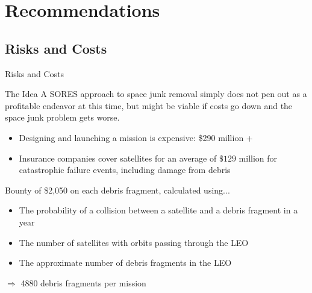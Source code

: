 \documentclass{beamer}
\begin{document}
\section{Recommendations}

\subsection{Risks and Costs}

\begin{frame}{Risks and Costs}
  \begin{block}{The Idea}
 A SORES approach to space junk removal simply does not pen out as a profitable endeavor at this time, but might be viable if costs go down and the space junk problem gets worse.
\end{block}
  \begin{itemize}
  \item {
    Designing and launching a mission is expensive: \$290 million + \cite{cost}
  }
  \item {   
   Insurance companies cover satellites for an average of \(\$129\) million for catastrophic failure events, including damage from debris \cite{cost}
  }
  \end{itemize}
  \pause
  Bounty of \$2,050 on each debris fragment, calculated using...
  \begin{itemize}
    \item{
   The probability of a collision between a satellite and a debris fragment in a year
  }
  \item {   
    The number of satellites with orbits passing through the LEO
  }
\item {   
    The approximate number of debris fragments in the LEO
  }
  \end{itemize}
  \begin{center}
   \(\Rightarrow{}\) 4880 debris fragments per mission
  \end{center}
 
\end{frame}
\end{document}
